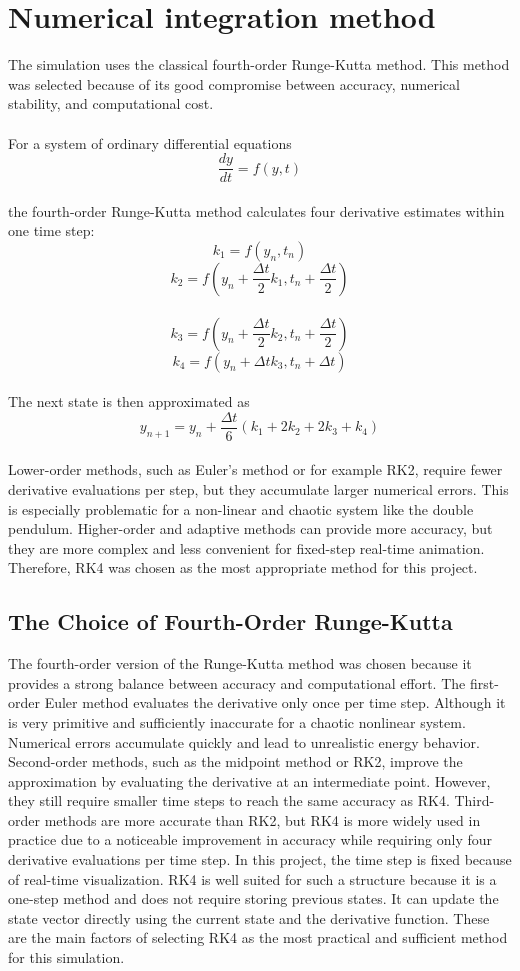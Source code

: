 \documentclass[12pt,a4paper]{article}
\begin{document}
\section{Numerical integration method}

The simulation uses the classical fourth-order Runge-Kutta method. This method was selected because of its good compromise between accuracy, numerical stability, and computational cost.
\\\\
For a system of ordinary differential equations
\[\frac{dy}{dt}=f(y, t)\]\\
the fourth-order Runge-Kutta method calculates four derivative estimates within one time step:
\[k_1 = f(y_n, t_n)\]
\[k_2 = f\left(y_n + \frac{\Delta t}{2}k_1, t_n + \frac{\Delta t}{2}\right)\]\
\[k_3 = f\left(y_n + \frac{\Delta t}{2}k_2, t_n + \frac{\Delta t}{2}\right)\]
\[k_4 = f\left(y_n + \Delta t k_3, t_n + \Delta t\right)\]\\
The next state is then approximated as
\[y_{n+1}=y_n+\frac{\Delta t}{6}\left(k_1+2k_2+2k_3+k_4\right)\]\\
Lower-order methods, such as Euler's method or for example RK2, require fewer derivative evaluations per step, but they accumulate larger numerical errors. This is especially problematic for a non-linear and chaotic system like the double pendulum. Higher-order and adaptive methods can provide more accuracy, but they are more complex and less convenient for fixed-step real-time animation. Therefore, RK4 was chosen as the most appropriate method for this project.

\subsection{The Choice of Fourth-Order Runge-Kutta}

The fourth-order version of the Runge-Kutta method was chosen because it provides a strong balance between accuracy and computational effort. The first-order Euler method evaluates the derivative only once per time step. Although it is very primitive and sufficiently inaccurate for a chaotic nonlinear system. Numerical errors accumulate quickly and lead to unrealistic energy behavior. Second-order methods, such as the midpoint method or RK2, improve the approximation by evaluating the derivative at an intermediate point. However, they still require smaller time steps to reach the same accuracy as RK4. Third-order methods are more accurate than RK2, but RK4 is more widely used in practice due to a noticeable improvement in accuracy while requiring only four derivative evaluations per time step. In this project, the time step is fixed because of real-time visualization. RK4 is well suited for such a structure because it is a one-step method and does not require storing previous states. It can update the state vector directly using the current state and the derivative function. These are the main factors of selecting RK4 as the most practical and sufficient method for this simulation.
\end{document}
